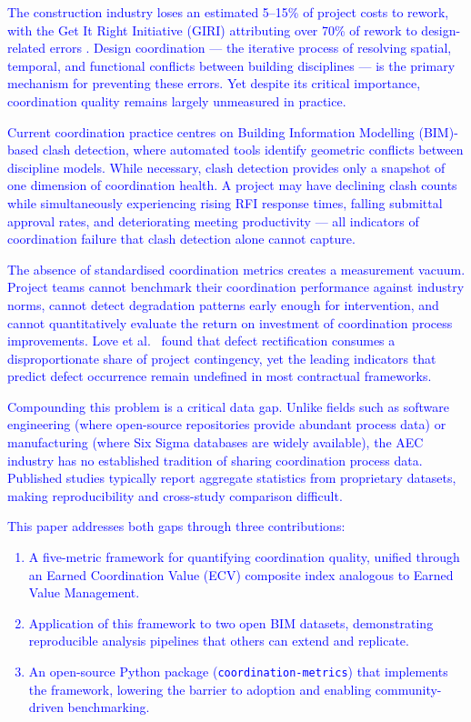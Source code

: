 \documentclass[conference]{IEEEtran}
\newcommand{\placeholder}[1]{\textcolor{blue}{#1}}
\begin{document}
\placeholder{
The construction industry loses an estimated 5--15\% of project costs to rework, with the Get It Right Initiative (GIRI) attributing over 70\% of rework to design-related errors \cite{giri2020}. Design coordination --- the iterative process of resolving spatial, temporal, and functional conflicts between building disciplines --- is the primary mechanism for preventing these errors. Yet despite its critical importance, coordination quality remains largely unmeasured in practice.

Current coordination practice centres on Building Information Modelling (BIM)-based clash detection, where automated tools identify geometric conflicts between discipline models. While necessary, clash detection provides only a snapshot of one dimension of coordination health. A project may have declining clash counts while simultaneously experiencing rising RFI response times, falling submittal approval rates, and deteriorating meeting productivity --- all indicators of coordination failure that clash detection alone cannot capture.

The absence of standardised coordination metrics creates a measurement vacuum. Project teams cannot benchmark their coordination performance against industry norms, cannot detect degradation patterns early enough for intervention, and cannot quantitatively evaluate the return on investment of coordination process improvements. Love et al.~\cite{love2018} found that defect rectification consumes a disproportionate share of project contingency, yet the leading indicators that predict defect occurrence remain undefined in most contractual frameworks.

Compounding this problem is a critical data gap. Unlike fields such as software engineering (where open-source repositories provide abundant process data) or manufacturing (where Six Sigma databases are widely available), the AEC industry has no established tradition of sharing coordination process data. Published studies typically report aggregate statistics from proprietary datasets, making reproducibility and cross-study comparison difficult.

This paper addresses both gaps through three contributions:
\begin{enumerate}
    \item A five-metric framework for quantifying coordination quality, unified through an Earned Coordination Value (ECV) composite index analogous to Earned Value Management.
    \item Application of this framework to two open BIM datasets, demonstrating reproducible analysis pipelines that others can extend and replicate.
    \item An open-source Python package (\texttt{coordination-metrics}) that implements the framework, lowering the barrier to adoption and enabling community-driven benchmarking.
\end{enumerate}
}
\end{document}
